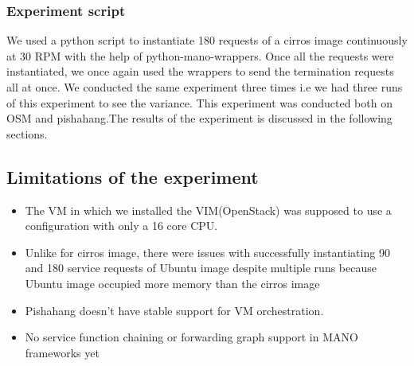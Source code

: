 \subsubsection{Experiment script}

We used a python script to instantiate 180 requests of a cirros image continuously at 30 RPM with the help of python-mano-wrappers. Once all the requests were instantiated, we once again used the wrappers to send the termination requests all at once. We conducted the same experiment three times i.e we had three runs of this experiment to see the variance. This experiment was conducted both on OSM and pishahang.The results of the experiment is discussed in the following sections.







\subsection{Limitations of the experiment}

\begin{itemize}
	\item The VM in which we installed the VIM(OpenStack) was supposed to use a configuration with only a 16 core CPU. 
	
	\item Unlike for cirros image, there were issues with successfully instantiating 90 and 180 service requests of Ubuntu image despite multiple runs because Ubuntu image occupied more memory than the cirros image
	
	\item Pishahang doesn't have stable support for VM orchestration.
	
	\item No service function chaining or forwarding graph support in MANO frameworks yet
	
\end{itemize}




